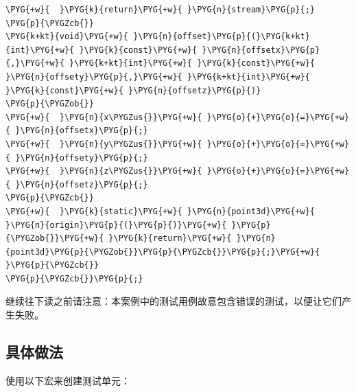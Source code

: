 \begin{codeblockbg}
\begin{Verbatim}[commandchars=\\\{\},breaklines=true,breakanywhere=true,fontsize=\codefont,xleftmargin=17bp]
\PYG{+w}{  }\PYG{k}{return}\PYG{+w}{ }\PYG{n}{stream}\PYG{p}{;}
\PYG{p}{\PYGZcb{}}
\PYG{k+kt}{void}\PYG{+w}{ }\PYG{n}{offset}\PYG{p}{(}\PYG{k+kt}{int}\PYG{+w}{ }\PYG{k}{const}\PYG{+w}{ }\PYG{n}{offsetx}\PYG{p}{,}\PYG{+w}{ }\PYG{k+kt}{int}\PYG{+w}{ }\PYG{k}{const}\PYG{+w}{ }\PYG{n}{offsety}\PYG{p}{,}\PYG{+w}{ }\PYG{k+kt}{int}\PYG{+w}{ }\PYG{k}{const}\PYG{+w}{ }\PYG{n}{offsetz}\PYG{p}{)}
\PYG{p}{\PYGZob{}}
\PYG{+w}{  }\PYG{n}{x\PYGZus{}}\PYG{+w}{ }\PYG{o}{+}\PYG{o}{=}\PYG{+w}{ }\PYG{n}{offsetx}\PYG{p}{;}
\PYG{+w}{  }\PYG{n}{y\PYGZus{}}\PYG{+w}{ }\PYG{o}{+}\PYG{o}{=}\PYG{+w}{ }\PYG{n}{offsety}\PYG{p}{;}
\PYG{+w}{  }\PYG{n}{z\PYGZus{}}\PYG{+w}{ }\PYG{o}{+}\PYG{o}{=}\PYG{+w}{ }\PYG{n}{offsetz}\PYG{p}{;}
\PYG{p}{\PYGZcb{}}
\PYG{+w}{  }\PYG{k}{static}\PYG{+w}{ }\PYG{n}{point3d}\PYG{+w}{ }\PYG{n}{origin}\PYG{p}{(}\PYG{p}{)}\PYG{+w}{ }\PYG{p}{\PYGZob{}}\PYG{+w}{ }\PYG{k}{return}\PYG{+w}{ }\PYG{n}{point3d}\PYG{p}{\PYGZob{}}\PYG{p}{\PYGZcb{}}\PYG{p}{;}\PYG{+w}{ }\PYG{p}{\PYGZcb{}}
\PYG{p}{\PYGZcb{}}\PYG{p}{;}
\end{Verbatim}
\end{codeblockbg}



\begin{myNote}
继续往下读之前请注意：本案例中的测试用例故意包含错误的测试，以便让它们产生失败。
\end{myNote}



\subsection{具体做法}



使用以下宏来创建测试单元：



